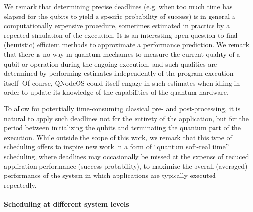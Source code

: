 We remark that determining precise deadlines (e.g. when too much time has elapsed for the qubits to yield a specific probability of success) is in general a computationally expensive procedure, sometimes estimated in practice by a repeated simulation of the execution. It is an interesting open question to find (heuristic) efficient methods to approximate a performance prediction. We remark that there is no way in quantum mechanics to measure the current quality of a qubit or operation during the ongoing execution, and such qualities are determined by performing estimates independently of the program execution itself. Of course, \ac{QNodeOS} could itself engage in such estimates when idling in order to update its knowledge of the capabilities of the quantum hardware.

To allow for potentially time-consuming classical pre- and post-processing, it is natural to apply such deadlines not for the entirety of the application, but for the period between initializing the qubits and terminating the quantum part of the execution. While outside the scope of this work, we remark that this type of scheduling offers to inspire new work in a form of ``quantum soft-real time'' scheduling, where deadlines may occasionally be missed at the expense of reduced application performance (success probability), to maximize the overall (averaged) performance of the system in which
applications are typically executed repeatedly. 

\paragraph{Scheduling at different system levels}

